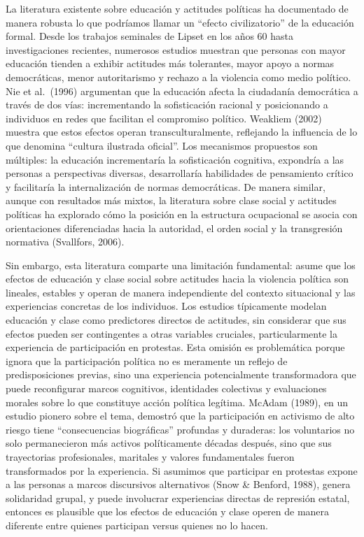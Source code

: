 \documentclass[
  12pt,
]{article}
\begin{document}
La literatura existente sobre educación y actitudes políticas ha
documentado de manera robusta lo que podríamos llamar un ``efecto
civilizatorio'' de la educación formal. Desde los trabajos seminales de
Lipset en los años 60 hasta investigaciones recientes, numerosos
estudios muestran que personas con mayor educación tienden a exhibir
actitudes más tolerantes, mayor apoyo a normas democráticas, menor
autoritarismo y rechazo a la violencia como medio político. Nie et
al.~(1996) argumentan que la educación afecta la ciudadanía democrática
a través de dos vías: incrementando la sofisticación racional y
posicionando a individuos en redes que facilitan el compromiso político.
Weakliem (2002) muestra que estos efectos operan transculturalmente,
reflejando la influencia de lo que denomina ``cultura ilustrada
oficial''. Los mecanismos propuestos son múltiples: la educación
incrementaría la sofisticación cognitiva, expondría a las personas a
perspectivas diversas, desarrollaría habilidades de pensamiento crítico
y facilitaría la internalización de normas democráticas. De manera
similar, aunque con resultados más mixtos, la literatura sobre clase
social y actitudes políticas ha explorado cómo la posición en la
estructura ocupacional se asocia con orientaciones diferenciadas hacia
la autoridad, el orden social y la transgresión normativa (Svallfors,
2006).

Sin embargo, esta literatura comparte una limitación fundamental: asume
que los efectos de educación y clase social sobre actitudes hacia la
violencia política son lineales, estables y operan de manera
independiente del contexto situacional y las experiencias concretas de
los individuos. Los estudios típicamente modelan educación y clase como
predictores directos de actitudes, sin considerar que sus efectos pueden
ser contingentes a otras variables cruciales, particularmente la
experiencia de participación en protestas. Esta omisión es problemática
porque ignora que la participación política no es meramente un reflejo
de predisposiciones previas, sino una experiencia potencialmente
transformadora que puede reconfigurar marcos cognitivos, identidades
colectivas y evaluaciones morales sobre lo que constituye acción
política legítima. McAdam (1989), en un estudio pionero sobre el tema,
demostró que la participación en activismo de alto riesgo tiene
``consecuencias biográficas'' profundas y duraderas: los voluntarios no
solo permanecieron más activos políticamente décadas después, sino que
sus trayectorias profesionales, maritales y valores fundamentales fueron
transformados por la experiencia. Si asumimos que participar en
protestas expone a las personas a marcos discursivos alternativos (Snow
\& Benford, 1988), genera solidaridad grupal, y puede involucrar
experiencias directas de represión estatal, entonces es plausible que
los efectos de educación y clase operen de manera diferente entre
quienes participan versus quienes no lo hacen.
\end{document}
